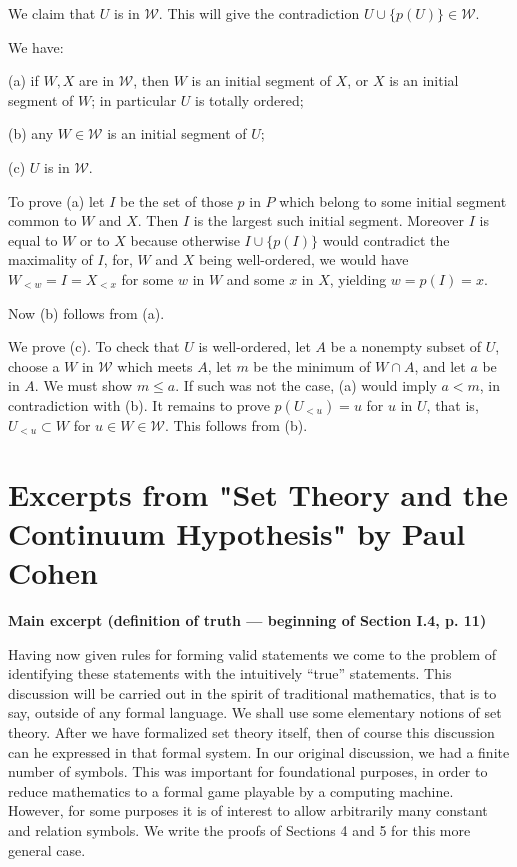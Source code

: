 \documentclass[12pt]{article}
\begin{document}
We claim that $U$ is in $\mathcal W$. This will give the contradiction $U\cup\{p(U)\}\in\mathcal W$. 

We have: 

(a) if $W,X$ are in $\mathcal W$, then $W$ is an initial segment of $X$, or $X$ is an initial segment of $W$; in particular $U$ is totally ordered;

(b) any $W\in\mathcal W$ is an initial segment of $U$; 

(c) $U$ is in $\mathcal W$.

To prove (a) let $I$ be the set of those $p$ in $P$ which belong to some initial segment common to $W$ and $X$. Then $I$ is the largest such initial segment. Moreover $I$ is equal to $W$ or to $X$ because otherwise $I\cup\{p(I)\}$ would contradict the maximality of $I$, for, $W$ and $X$ being well-ordered, we would have $W_{<w}=I=X_{<x}$ for some $w$ in $W$ and some $x$ in $X$, yielding $w=p(I)=x$. 

Now (b) follows from (a). 

We prove (c). To check that $U$ is well-ordered, let $A$ be a nonempty subset of $U$, choose a $W$ in $\mathcal W$ which meets $A$, let $m$ be the minimum of $W\cap A$, and let $a$ be in $A$. We must show $m\le a$. If such was not the case, (a) would imply $a<m$, in contradiction with (b). It remains to prove $p(U_{<u})=u$ for $u$ in $U$, that is, $U_{<u}\subset W$ for $u\in W\in\mathcal W$. This follows from (b). 

\newpage 

\section{Excerpts from "Set Theory and the Continuum Hypothesis" by Paul Cohen} 

\centerline{\textbf{Main excerpt (definition of truth --- beginning of Section I.4, p. 11)}}

Having now given rules for forming valid statements we come to the problem of identifying these statements with the intuitively ``true'' statements. This discussion will be carried out in the spirit of traditional mathematics, that is to say, outside of any formal language. We shall use some elementary notions of set theory. After we have formalized set theory itself, then of course this discussion can he expressed in that formal system. In our original discussion, we had a finite number of symbols. This was important for foundational purposes, in order to reduce mathematics to a formal game playable by a computing machine. However, for some purposes it is of interest to allow arbitrarily many constant and relation symbols. We write the proofs of Sections 4 and 5 for this more general case.
\end{document}
